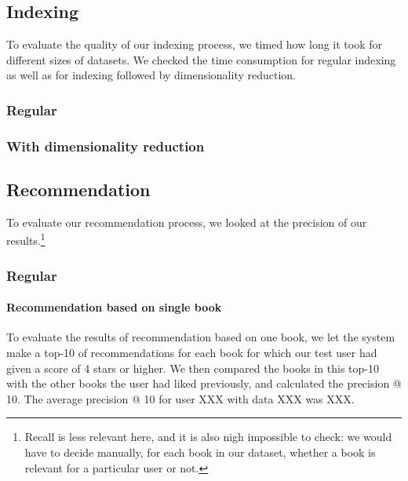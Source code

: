 \documentclass[10pt,a4paper]{paper}
\begin{document}
\subsection{Indexing}

To evaluate the quality of our indexing process, we timed how long it took for different sizes of datasets. We checked the time consumption for regular indexing as well as for indexing followed by dimensionality reduction. %
\subsubsection{Regular}


\subsubsection{With dimensionality reduction}



\subsection{Recommendation}

To evaluate our recommendation process, we looked at the precision of our results.\footnote{Recall is less relevant here, and it is also nigh impossible to check: we would have to decide manually, for each book in our dataset, whether a book is relevant for a particular user or not.}


\subsubsection{Regular}

\paragraph{Recommendation based on single book}
To evaluate the results of recommendation based on one book, we let the system make a top-10 of recommendations for each book for which our test user had given a score of 4 stars or higher. We then compared the books in this top-10 with the other books the user had liked previously, and calculated the precision @ 10.
The average precision @ 10 for user XXX with data XXX was XXX. %
\end{document}
